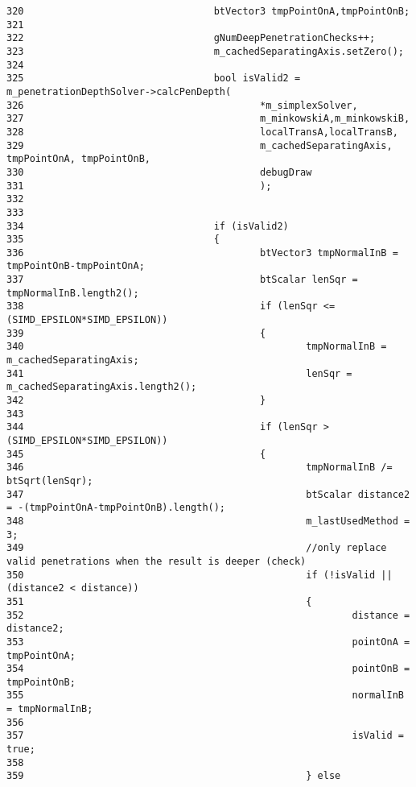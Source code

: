 \begin{Code}
\begin{verbatim}
320                                 btVector3 tmpPointOnA,tmpPointOnB;
321                                 
322                                 gNumDeepPenetrationChecks++;
323                                 m_cachedSeparatingAxis.setZero();
324 
325                                 bool isValid2 = m_penetrationDepthSolver->calcPenDepth( 
326                                         *m_simplexSolver, 
327                                         m_minkowskiA,m_minkowskiB,
328                                         localTransA,localTransB,
329                                         m_cachedSeparatingAxis, tmpPointOnA, tmpPointOnB,
330                                         debugDraw
331                                         );
332 
333 
334                                 if (isValid2)
335                                 {
336                                         btVector3 tmpNormalInB = tmpPointOnB-tmpPointOnA;
337                                         btScalar lenSqr = tmpNormalInB.length2();
338                                         if (lenSqr <= (SIMD_EPSILON*SIMD_EPSILON))
339                                         {
340                                                 tmpNormalInB = m_cachedSeparatingAxis;
341                                                 lenSqr = m_cachedSeparatingAxis.length2();
342                                         }
343 
344                                         if (lenSqr > (SIMD_EPSILON*SIMD_EPSILON))
345                                         {
346                                                 tmpNormalInB /= btSqrt(lenSqr);
347                                                 btScalar distance2 = -(tmpPointOnA-tmpPointOnB).length();
348                                                 m_lastUsedMethod = 3;
349                                                 //only replace valid penetrations when the result is deeper (check)
350                                                 if (!isValid || (distance2 < distance))
351                                                 {
352                                                         distance = distance2;
353                                                         pointOnA = tmpPointOnA;
354                                                         pointOnB = tmpPointOnB;
355                                                         normalInB = tmpNormalInB;
356                                                         
357                                                         isValid = true;
358                                                         
359                                                 } else

\end{verbatim}
\end{Code}
